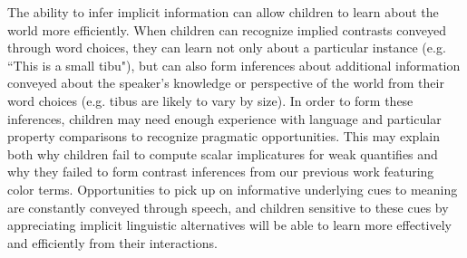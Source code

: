 \documentclass[10pt,letterpaper]{article}
\begin{document}
The ability to infer implicit information can allow children to learn about the world more efficiently.  When children can recognize implied contrasts conveyed through word choices, they can learn not only about a particular instance (e.g. ``This is a small tibu"), but can also form inferences about additional information conveyed about the speaker's knowledge or perspective of the world from their word choices (e.g. tibus are likely to vary by size).  In order to form these inferences, children may need enough experience with language and particular property comparisons to recognize pragmatic opportunities.  This may explain both why children fail to compute scalar implicatures for weak quantifies and why they failed to form contrast inferences from our previous work featuring color terms.  Opportunities to pick up on informative underlying cues to meaning are constantly conveyed through speech, and children sensitive to these cues by appreciating implicit linguistic alternatives will be able to learn more effectively and efficiently from their interactions. 


\end{document}
